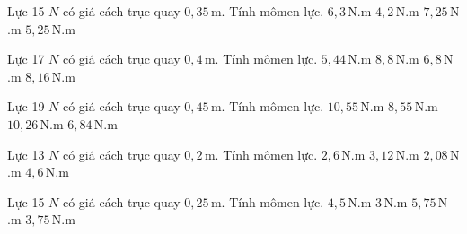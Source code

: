 \begin{ex}
Lực 15 $N$ có giá cách trục quay $0,35\,\text{m}$. Tính mômen lực.
\choice
{$6,3\,\text{N}$.m}
{$4,2\,\text{N}$.m}
{$7,25\,\text{N}$.m}
{\True $5,25\,\text{N}$.m}
\end{ex}

\begin{ex}
Lực 17 $N$ có giá cách trục quay $0,4\,\text{m}$. Tính mômen lực.
\choice
{$5,44\,\text{N}$.m}
{$8,8\,\text{N}$.m}
{\True $6,8\,\text{N}$.m}
{$8,16\,\text{N}$.m}
\end{ex}

\begin{ex}
Lực 19 $N$ có giá cách trục quay $0,45\,\text{m}$. Tính mômen lực.
\choice
{$10,55\,\text{N}$.m}
{\True $8,55\,\text{N}$.m}
{$10,26\,\text{N}$.m}
{$6,84\,\text{N}$.m}
\end{ex}

\begin{ex}
Lực 13 $N$ có giá cách trục quay $0,2\,\text{m}$. Tính mômen lực.
\choice
{\True $2,6\,\text{N}$.m}
{$3,12\,\text{N}$.m}
{$2,08\,\text{N}$.m}
{$4,6\,\text{N}$.m}
\end{ex}

\begin{ex}
Lực 15 $N$ có giá cách trục quay $0,25\,\text{m}$. Tính mômen lực.
\choice
{$4,5\,\text{N}$.m}
{$3\,\text{N}$.m}
{$5,75\,\text{N}$.m}
{\True $3,75\,\text{N}$.m}
\end{ex}


